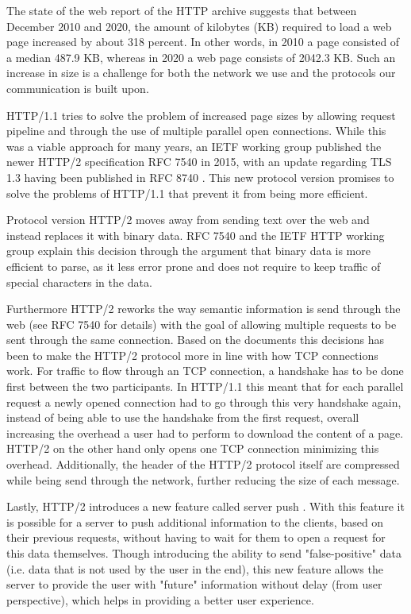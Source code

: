 \documentclass[conference]{IEEEtran}
\begin{document}
The state of the web report of the HTTP archive \cite{httpArchive} suggests that between December 2010 and 2020, the amount of kilobytes (KB) required to load a web page increased by about 318 percent. In other words, in 2010 a page consisted of a median 487.9 KB, whereas in 2020 a web page consists of 2042.3 KB. Such an increase in size is a challenge for both the network we use and the protocols our communication is built upon.

HTTP/1.1 tries to solve the problem of increased page sizes by allowing request pipeline and through the use of multiple parallel open connections. While this was a viable approach for many years, an IETF working group published the newer HTTP/2 specification RFC 7540 \cite{rfc7540} in 2015, with an update regarding TLS 1.3 having been published in RFC 8740 \cite{rfc8740}. This new protocol version promises to solve the problems of HTTP/1.1 that prevent it from being more efficient.

Protocol version HTTP/2 moves away from sending text over the web and instead replaces it with binary data. RFC 7540 \cite{rfc7540} and the IETF HTTP working group \cite{httpwgHTTP2} explain this decision through the argument that binary data is more efficient to parse, as it less error prone and does not require to keep traffic of special characters in the data.

Furthermore HTTP/2 reworks the way semantic information is send through the web (see RFC 7540 \cite{rfc7540} for details) with the goal of allowing multiple requests to be sent through the same connection. Based on the documents \cite{rfc7540} \cite{httpwgHTTP2} this decisions has been to make the HTTP/2 protocol more in line with how TCP connections work. For traffic to flow through an TCP connection, a handshake has to be done first between the two participants. In HTTP/1.1 this meant that for each parallel request a newly opened connection had to go through this very handshake again, instead of being able to use the handshake from the first request, overall increasing the overhead a user had to perform to download the content of a page. HTTP/2 on the other hand only opens one TCP connection minimizing this overhead. Additionally, the header of the HTTP/2 protocol itself are compressed while being send through the network, further reducing the size of each message.

Lastly, HTTP/2 introduces a new feature called server push \cite{rfc7540}. With this feature it is possible for a server to push additional information to the clients, based on their previous requests, without having to wait for them to open a request for this data themselves. Though introducing the ability to send "false-positive" data (i.e. data that is not used by the user in the end), this new feature allows the server to provide the user with "future" information without delay (from user perspective), which helps in providing a better user experience.
\end{document}
